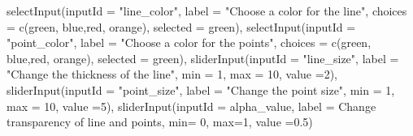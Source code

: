 \documentclass[
]{book}
\newenvironment{Shaded}{\begin{snugshade}}{\end{snugshade}}
\newcommand{\AttributeTok}[1]{\textcolor[rgb]{0.77,0.63,0.00}{#1}}
\newcommand{\DecValTok}[1]{\textcolor[rgb]{0.00,0.00,0.81}{#1}}
\newcommand{\FloatTok}[1]{\textcolor[rgb]{0.00,0.00,0.81}{#1}}
\newcommand{\FunctionTok}[1]{\textcolor[rgb]{0.00,0.00,0.00}{#1}}
\newcommand{\NormalTok}[1]{#1}
\newcommand{\StringTok}[1]{\textcolor[rgb]{0.31,0.60,0.02}{#1}}
\begin{document}
\begin{Shaded}
\begin{Highlighting}[]
            \FunctionTok{selectInput}\NormalTok{(}\AttributeTok{inputId =} \StringTok{"line\_color"}\NormalTok{,}
                        \AttributeTok{label =} \StringTok{"Choose a color for the line"}\NormalTok{,}
                        \AttributeTok{choices =} \FunctionTok{c}\NormalTok{(}\StringTok{\textquotesingle{}green\textquotesingle{}}\NormalTok{, }\StringTok{\textquotesingle{}blue\textquotesingle{}}\NormalTok{,}\StringTok{\textquotesingle{}red\textquotesingle{}}\NormalTok{, }\StringTok{\textquotesingle{}orange\textquotesingle{}}\NormalTok{),}
                        \AttributeTok{selected =} \StringTok{\textquotesingle{}green\textquotesingle{}}\NormalTok{),}
            \FunctionTok{selectInput}\NormalTok{(}\AttributeTok{inputId =} \StringTok{"point\_color"}\NormalTok{,}
                        \AttributeTok{label =} \StringTok{"Choose a color for the points"}\NormalTok{,}
                        \AttributeTok{choices =} \FunctionTok{c}\NormalTok{(}\StringTok{\textquotesingle{}green\textquotesingle{}}\NormalTok{, }\StringTok{\textquotesingle{}blue\textquotesingle{}}\NormalTok{,}\StringTok{\textquotesingle{}red\textquotesingle{}}\NormalTok{, }\StringTok{\textquotesingle{}orange\textquotesingle{}}\NormalTok{),}
                        \AttributeTok{selected =} \StringTok{\textquotesingle{}green\textquotesingle{}}\NormalTok{),}
            \FunctionTok{sliderInput}\NormalTok{(}\AttributeTok{inputId =} \StringTok{"line\_size"}\NormalTok{,}
                        \AttributeTok{label =} \StringTok{"Change the thickness of the line"}\NormalTok{,}
                        \AttributeTok{min =} \DecValTok{1}\NormalTok{,}
                        \AttributeTok{max =} \DecValTok{10}\NormalTok{,}
                        \AttributeTok{value =}\DecValTok{2}\NormalTok{),}
            \FunctionTok{sliderInput}\NormalTok{(}\AttributeTok{inputId =} \StringTok{"point\_size"}\NormalTok{,}
                        \AttributeTok{label =} \StringTok{"Change the point size"}\NormalTok{,}
                        \AttributeTok{min =} \DecValTok{1}\NormalTok{,}
                        \AttributeTok{max =} \DecValTok{10}\NormalTok{,}
                        \AttributeTok{value =}\DecValTok{5}\NormalTok{),}
            \FunctionTok{sliderInput}\NormalTok{(}\AttributeTok{inputId =} \StringTok{\textquotesingle{}alpha\_value\textquotesingle{}}\NormalTok{,}
                        \AttributeTok{label =} \StringTok{\textquotesingle{}Change transparency of line and points\textquotesingle{}}\NormalTok{,}
                        \AttributeTok{min=} \DecValTok{0}\NormalTok{,}
                        \AttributeTok{max=}\DecValTok{1}\NormalTok{,}
                        \AttributeTok{value =}\FloatTok{0.5}\NormalTok{)}


\end{Highlighting}
\end{Shaded}
\end{document}

